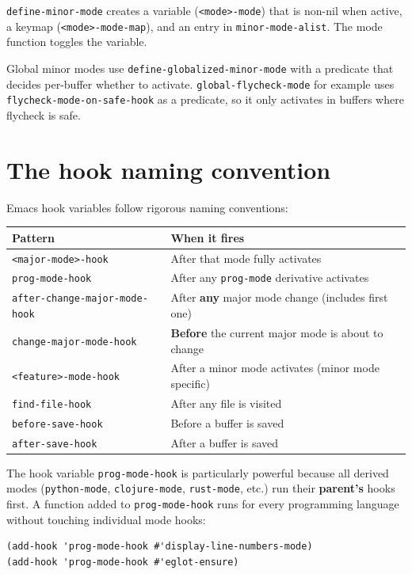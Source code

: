 \texttt{define-minor-mode} creates a variable (\texttt{<mode>-mode}) that is non-nil when active, a keymap (\texttt{<mode>-mode-map}), and an entry in \texttt{minor-mode-alist}. The mode function toggles the variable.

Global minor modes use \texttt{define-globalized-minor-mode} with a predicate that decides per-buffer whether to activate. \texttt{global-flycheck-mode} for example uses \texttt{flycheck-mode-on-safe-hook} as a predicate, so it only activates in buffers where flycheck is safe.

\section{The hook naming convention}\label{the-hook-naming-convention}

Emacs hook variables follow rigorous naming conventions:

\begin{longtable}[]{@{}ll@{}}
\toprule
Pattern & When it fires \\
\midrule
\texttt{<major-mode>-hook} & After that mode fully activates \\
\texttt{prog-mode-hook} & After any \texttt{prog-mode} derivative activates \\
\texttt{after-change-major-mode-hook} & After \textbf{any} major mode change (includes first one) \\
\texttt{change-major-mode-hook} & \textbf{Before} the current major mode is about to change \\
\texttt{<feature>-mode-hook} & After a minor mode activates (minor mode specific) \\
\texttt{find-file-hook} & After any file is visited \\
\texttt{before-save-hook} & Before a buffer is saved \\
\texttt{after-save-hook} & After a buffer is saved \\
\bottomrule
\end{longtable}

The hook variable \texttt{prog-mode-hook} is particularly powerful because all derived modes (\texttt{python-mode}, \texttt{clojure-mode}, \texttt{rust-mode}, etc.) run their \textbf{parent's} hooks first. A function added to \texttt{prog-mode-hook} runs for every programming language without touching individual mode hooks:

\begin{verbatim}
(add-hook 'prog-mode-hook #'display-line-numbers-mode)
(add-hook 'prog-mode-hook #'eglot-ensure)
\end{verbatim}


